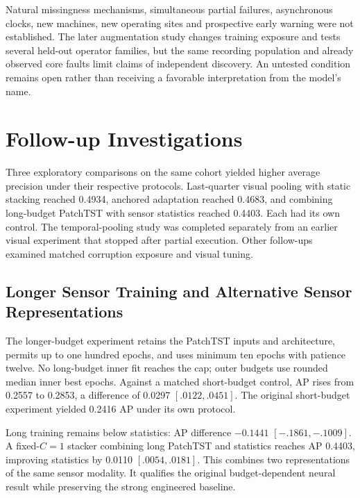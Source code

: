 Natural missingness mechanisms, simultaneous partial failures, asynchronous clocks, new
machines, new operating sites and prospective early warning were not established. The
later augmentation study changes training exposure and tests several held-out operator
families, but the same recording population and already observed core faults limit
claims of independent discovery. An untested condition remains open rather than
receiving a favorable interpretation from the model's name.

\section{Follow-up Investigations}
Three exploratory comparisons on the same cohort yielded higher average precision under
their respective protocols. Last-quarter visual pooling with static stacking reached
0.4934, anchored adaptation reached 0.4683, and combining long-budget PatchTST with
sensor statistics reached 0.4403. Each had its own control. The temporal-pooling study
was completed separately from an earlier visual experiment that stopped after partial
execution. Other follow-ups examined matched corruption exposure and visual
tuning.

\subsection{Longer Sensor Training and Alternative Sensor Representations}
The longer-budget experiment retains the PatchTST inputs and architecture, permits up to
one hundred epochs, and uses minimum ten epochs with patience twelve. No long-budget
inner fit reaches the cap; outer budgets use rounded median inner best epochs. Against a
matched short-budget control, AP rises from 0.2557 to 0.2853, a difference of 0.0297
$[.0122,.0451]$. The original short-budget experiment yielded 0.2416 AP under its own
protocol.

Long training remains below statistics: AP difference $-0.1441$ $[-.1861,-.1009]$. A
fixed-$C=1$ stacker combining long PatchTST and statistics reaches AP 0.4403, improving
statistics by 0.0110 $[.0054,.0181]$. This combines two representations of the same
sensor modality. It qualifies the original budget-dependent neural result while
preserving the strong engineered baseline.

